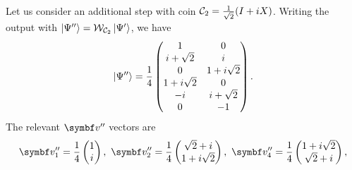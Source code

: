 \begin{example}[label=ex:QWs:conditions_few_steps]
    Let us consider an additional step with coin ${\mathcal{C}}_2=\frac{1}{\sqrt2}(I + iX)$.
    Writing the output with $\ket{\Psi''}={\mathcal{W}}_{{\mathcal{C}}_2}\ket{\Psi'}$, we have
    \begin{equation}
        \ket{\Psi''} = \frac{1}{4}
        \begin{pmatrix}
            1 & 0 \\
            i + \sqrt2 & i \\
            0 & 1 + i\sqrt2 \\
            1 + i\sqrt2 & 0 \\
            -i & i + \sqrt2 \\
            0 & -1
        \end{pmatrix}.
    \end{equation}
    The relevant $\bs v''$ vectors are
    \begin{equation}
    \begin{aligned}
        \bs v''_1 = \frac{1}{4}\begin{pmatrix} 1 \\ i \end{pmatrix},
        \,\,
        \bs v''_2 = \frac{1}{4}\begin{pmatrix} \sqrt2 + i \\ 1 + i\sqrt2 \end{pmatrix},
        \,\,
        \bs v''_4 = \frac{1}{4}\begin{pmatrix} 1 + i\sqrt2\\ \sqrt2 + i \end{pmatrix},

\end{aligned}
\end{equation}
\end{example}
